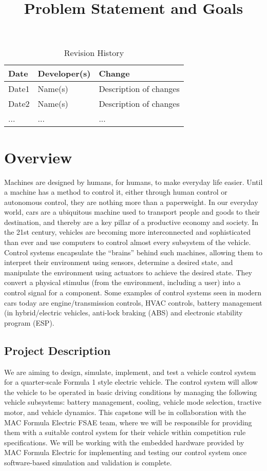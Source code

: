 \documentclass{article}
\title{Problem Statement and Goals\\\progname}
\author{\authname}
\date{}
\begin{document}
\maketitle

\begin{table}[hp]
\caption{Revision History} \label{TblRevisionHistory}
\begin{tabularx}{\textwidth}{llX}
\toprule
\textbf{Date} & \textbf{Developer(s)} & \textbf{Change}\\
\midrule
Date1 & Name(s) & Description of changes\\
Date2 & Name(s) & Description of changes\\
... & ... & ...\\
\bottomrule
\end{tabularx}
\end{table}

\section{Overview}
Machines are designed by humans, for humans, 
to make everyday life easier. Until a machine has a 
method to control it, either through human control or 
autonomous control, they are nothing more than a paperweight. 
In our everyday world, cars are a ubiquitous machine used to 
transport people and goods to their destination, and thereby 
are a key pillar of a productive economy and society. In the 
21st century, vehicles are becoming more interconnected and 
sophisticated than ever and use computers to control almost 
every subsystem of the vehicle. Control systems encapsulate 
the “brains” behind such machines, allowing them to interpret 
their environment using sensors, determine a desired state, and 
manipulate the environment using actuators to achieve the 
desired state. They convert a physical stimulus (from the 
environment, including a user) into a control signal for a 
component. Some examples of control systems seen in modern 
cars today are engine/transmission controls, HVAC controls, 
battery management (in hybrid/electric vehicles, anti-lock 
braking (ABS) and electronic stability program (ESP).

\subsection{Project Description}
We are aiming to design, simulate, implement, and test a vehicle 
control system for a quarter-scale Formula 1 style electric vehicle. 
The control system will allow the vehicle to be operated in basic driving 
conditions by managing the following vehicle subsystems: battery management, 
cooling, vehicle mode selection, tractive motor, and vehicle dynamics. 
This capstone will be in collaboration with the MAC Formula Electric FSAE team, 
where we will be responsible for providing them with a suitable control 
system for their vehicle within competition rule specifications. We will 
be working with the embedded hardware provided by MAC Formula Electric for 
implementing and testing our control system once software-based simulation and 
validation is complete.
\end{document}

